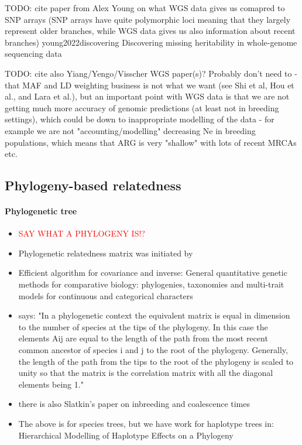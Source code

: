 TODO: cite paper from Alex Young on what WGS data gives us comapred to SNP arrays
      (SNP arrays have quite polymorphic loci meaning that they largely represent
       older branches, while WGS data gives us also information about recent branches)
       young2022discovering Discovering missing heritability in whole-genome sequencing data

TODO: cite also Yiang/Yengo/Visscher WGS paper(s)? Probably don't need to - that MAF
      and LD weighting business is not what we want (see Shi et al, Hou et al., and Lara et al.),
      but an important point with WGS data is that we are not getting much more
      accuracy of genomic predictions (at least not in breeding settings), which
      could be down to inappropriate modelling of the data - for example we are
      not "accounting/modelling" decreasing Ne in breeding populations, which means
      that ARG is very "shallow" with lots of recent MRCAs etc.


\subsection{Phylogeny-based relatedness}

\paragraph{Phylogenetic tree}
\begin{itemize}
  \item \textcolor{red}{SAY WHAT A PHYLOGENY IS!?}
  \item Phylogenetic relatedness matrix was initiated by \cite{lynch1991methods}
  \item Efficient algorithm for covariance and inverse: General quantitative genetic methods for comparative biology: phylogenies, taxonomies and multi-trait models for continuous and categorical characters \citep{hadfield2010general}
  \item \citep{hadfield2010general} says: "In a phylogenetic context the equivalent matrix is equal in dimension to the number of species at the tips of the phylogeny. In this case the elements Aij are equal to the length of the path from the most recent common ancestor of species i and j to the root of the phylogeny. Generally, the length of the path from the tips to the root of the phylogeny is scaled to unity so that the matrix is the correlation matrix with all the diagonal elements being 1."
  \item there is also Slatkin's paper on inbreeding and coalescence times \cite{slatkin1991inbreeding}
  \item The above is for species trees, but we have work for haplotype trees in: Hierarchical Modelling of Haplotype Effects on a Phylogeny \cite{selle2021hierarchical}
\end{itemize}

